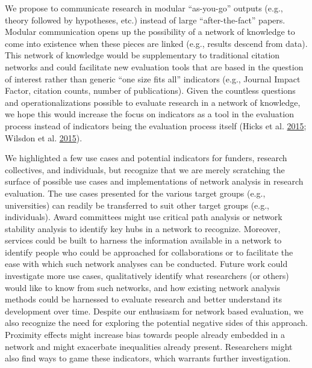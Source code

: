 \documentclass[a5paper]{book}
\begin{document}
We propose to communicate research in modular \enquote{as-you-go}
outputs (e.g., theory followed by hypotheses, etc.) instead of large
\enquote{after-the-fact} papers. Modular communication opens up the
possibility of a network of knowledge to come into existence when these
pieces are linked (e.g., results descend from data). This network of
knowledge would be supplementary to traditional citation networks and
could facilitate new evaluation tools that are based in the question of
interest rather than generic \enquote{one size fits all} indicators
(e.g., Journal Impact Factor, citation counts, number of publications).
Given the countless questions and operationalizations possible to
evaluate research in a network of knowledge, we hope this would increase
the focus on indicators as a tool in the evaluation process instead of
indicators being the evaluation process itself (Hicks et al.
\protect\hyperlink{ref-doi:10.1038ux2f520429a}{2015}; Wilsdon et al.
\protect\hyperlink{ref-doi:10.13140ux2fRG.2.1.4929.1363}{2015}).

We highlighted a few use cases and potential indicators for funders,
research collectives, and individuals, but recognize that we are merely
scratching the surface of possible use cases and implementations of
network analysis in research evaluation. The use cases presented for the
various target groups (e.g., universities) can readily be transferred to
suit other target groups (e.g., individuals). Award committees might use
critical path analysis or network stability analysis to identify key
hubs in a network to recognize. Moreover, services could be built to
harness the information available in a network to identify people who
could be approached for collaborations or to facilitate the ease with
which such network analyses can be conducted. Future work could
investigate more use cases, qualitatively identify what researchers (or
others) would like to know from such networks, and how existing network
analysis methods could be harnessed to evaluate research and better
understand its development over time. Despite our enthusiasm for network
based evaluation, we also recognize the need for exploring the potential
negative sides of this approach. Proximity effects might increase bias
towards people already embedded in a network and might exacerbate
inequalities already present. Researchers might also find ways to game
these indicators, which warrants further investigation.
\end{document}
